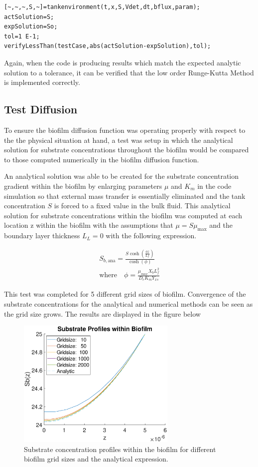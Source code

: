 \documentclass[letterpaper, twoside]{article}
\numberwithin{equation}{section}
\begin{document}
\begin{lstlisting}
[~,~,~,S,~]=tankenvironment(t,x,S,Vdet,dt,bflux,param);
actSolution=S; 
expSolution=So;
tol=1 E-1;
verifyLessThan(testCase,abs(actSolution-expSolution),tol); 
\end{lstlisting}

Again, when the code is producing results which match the expected analytic solution to a tolerance, it can be verified that the low order Runge-Kutta Method is implemented correctly.

\subsection{Test Diffusion}
To ensure the biofilm diffusion function was operating properly with respect to the the physical situation at hand, a test was setup in which the analytical solution for substrate concentrations throughout the biofilm would be compared to those computed numerically in the biofilm diffusion function.

An analytical solution was able to be created for the substrate concentration gradient within the biofilm by enlarging parameters $\mu$ and $K_m$ in the code simulation so that external mass transfer is essentially eliminated and the tank concentration $S$ is forced to a fixed value in the bulk fluid. This analytical solution for substrate concentrations within the biofilm was computed at each location z within the biofilm with the assumptions that $\mu={S}{\mu_\mathrm{max}}$ and the boundary layer thickness $L_L=0$ with the following expression.

\begin{align}
{S_{b,\mathrm{ana}}}=\frac{S{\cosh(\frac{{\phi}{z}}{Lf})}}{\cosh(\phi)}\\
\text{where}{\quad} {\phi}=\frac{\mu_{max}{X_b}{L_f^{2}}}{{D_e}{K_m}{Y_{xs}}}
\end{align}

This test was completed for 5 different grid sizes of biofilm. Convergence of the substrate concentrations for the analytical and numerical methods can be seen as the grid size grows. The results are displayed in the figure below

\begin{figure}[H]
  \centering
  \includegraphics[read=eps, width=3in]{BiofilmDiffusion_Figure1.eps}
  \caption{Substrate concentration profiles within the biofilm for different biofilm grid sizes and the analytical expression.}
\end{figure}
\end{document}
